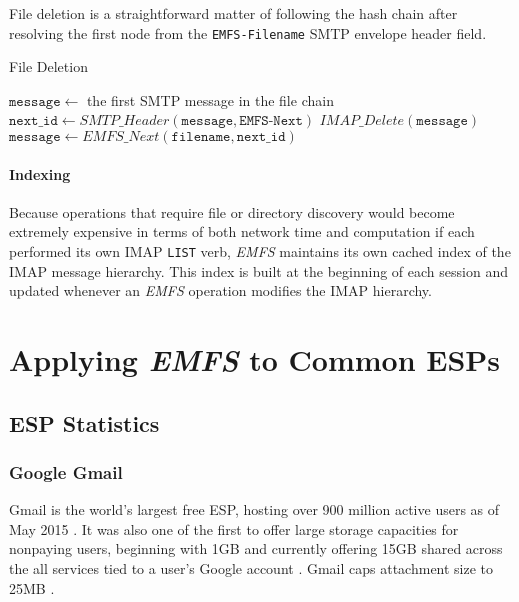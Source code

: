 \documentclass[12pt]{article}
\begin{document}
File deletion is a straightforward matter of following the hash chain after
resolving the first node from the \texttt{EMFS-Filename} SMTP envelope header
field.

\begin{algorithm}
\caption{File Deletion}
\begin{algorithmic}[1]
\State $\mathtt{message} \gets $ the first SMTP message in the file chain
\Do
\State $\mathtt{next\_id} \gets \mathit{SMTP\_Header}(\mathtt{message}, \texttt{EMFS-Next})$
\State $\mathit{IMAP\_Delete}(\mathtt{message})$
\State $\mathtt{message} \gets \mathit{EMFS\_Next}(\mathtt{filename}, \mathtt{next\_id})$
\EndProcedure
\end{algorithmic}
\end{algorithm}

\paragraph{Indexing}

Because operations that require file or directory discovery would become
extremely expensive in terms of both network time and computation if each
performed its own IMAP \texttt{LIST} verb, \textit{EMFS} maintains its own
cached index of the IMAP message hierarchy. This index is built at the beginning
of each session and updated whenever an \textit{EMFS} operation modifies the
IMAP hierarchy.

\section{Applying \textit{EMFS} to Common ESPs}

\subsection{ESP Statistics}

\subsubsection{Google Gmail}

Gmail is the world's largest free ESP, hosting over 900 million active users
as of May 2015 \cite{gmail:01}. It was also one of the first to offer large
storage capacities for nonpaying users, beginning with 1GB and currently
offering 15GB shared across the all services tied to a user's Google account
\cite{kuchinskas, gmail:02}. Gmail caps attachment size to 25MB
\cite{google:01}.
\end{document}

